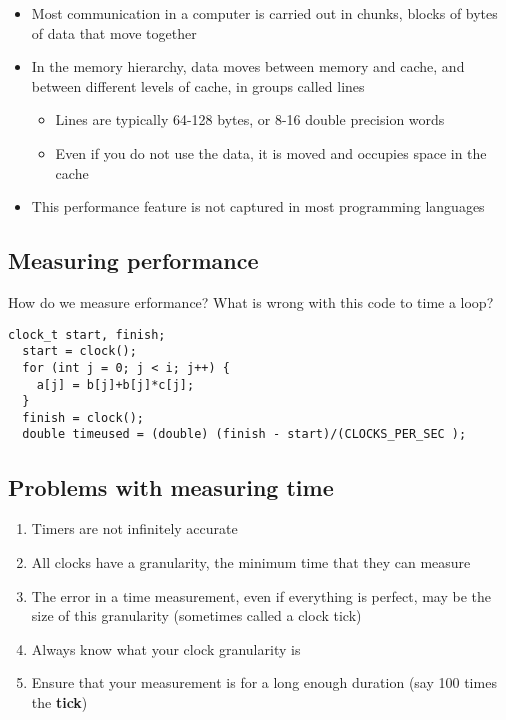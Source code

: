 \documentclass[%
oneside,                 %
final,                   %
10pt]{article}
\begin{document}
\begin{itemize}
\item Most communication in a computer is carried out in chunks, blocks of bytes of data that move together

\item In the memory hierarchy, data moves between memory and cache, and between different levels of cache, in groups called lines
\begin{itemize}

 \item Lines are typically 64-128 bytes, or 8-16 double precision words

 \item Even if you do not use the data, it is moved and occupies space in the cache

\end{itemize}

\noindent
\item This performance feature is not captured in most programming languages
\end{itemize}

\noindent
\subsection*{Measuring performance}

How do we measure erformance? What is wrong with this code to time a loop?
\begin{Verbatim}[numbers=none,fontsize=\fontsize{9pt}{9pt},baselinestretch=0.95]
  clock_t start, finish;
  start = clock();
  for (int j = 0; j < i; j++) {
    a[j] = b[j]+b[j]*c[j];
  }
  finish = clock();
  double timeused = (double) (finish - start)/(CLOCKS_PER_SEC );
\end{Verbatim}

\subsection*{Problems with measuring time}
\begin{enumerate}
\item Timers are not infinitely accurate

\item All clocks have a granularity, the minimum time that they can measure

\item The error in a time measurement, even if everything is perfect, may be the size of this granularity (sometimes called a clock tick)

\item Always know what your clock granularity is

\item Ensure that your measurement is for a long enough duration (say 100 times the \textbf{tick})
\end{enumerate}
\end{document}
